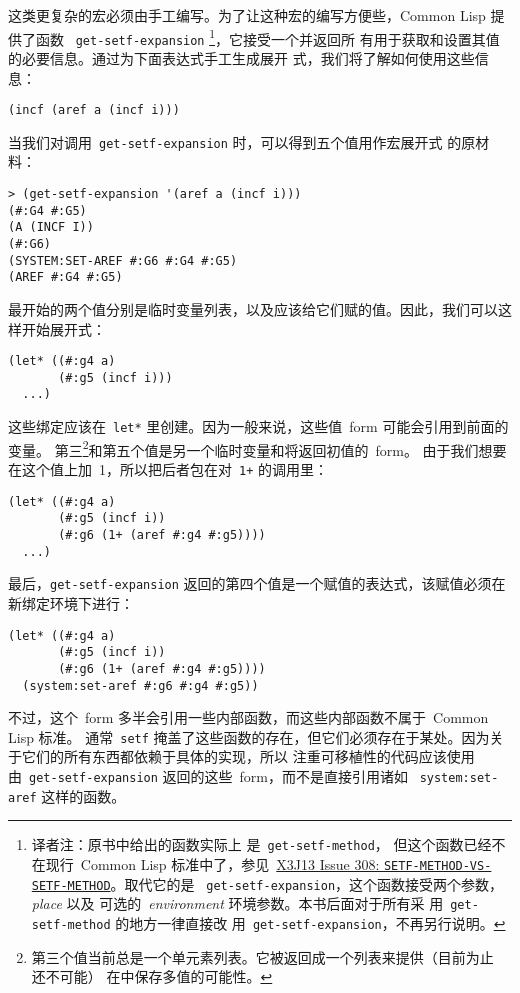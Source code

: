 这类更复杂的宏必须由手工编写。为了让这种宏的编写方便些，Common Lisp 提供了函数
~\verb|get-setf-expansion|
\footnote{译者注：原书中给出的函数实际上
  是~\texttt{get-setf-method}，
  但这个函数已经不在现行~Common Lisp 标准中了，参见~\href{www.lisp.org/HyperSpec/Issues/iss308_w.html}{X3J13 Issue 308:
  \texttt{SETF-METHOD-VS-SETF-METHOD}}。取代它的是
  ~\texttt{get-setf-expansion}，这个函数接受两个参数，\emph{place} 以及
  可选的~\emph{environment} 环境参数。本书后面对于所有采
  用~\texttt{get-setf-method} 的地方一律直接改
  用~\texttt{get-setf-expansion}，不再另行说明。}，它接受一个\gv{}并返回所
有用于获取和设置其值的必要信息。通过为下面表达式手工生成展开
式，我们将了解如何使用这些信息：
\begin{lstlisting}
(incf (aref a (incf i)))
\end{lstlisting}

当我们对\gv{}调用~\verb|get-setf-expansion| 时，可以得到五个值用作宏展开式
的原材料：
\begin{lstlisting}
> (get-setf-expansion '(aref a (incf i)))
(#:G4 #:G5)
(A (INCF I))
(#:G6)
(SYSTEM:SET-AREF #:G6 #:G4 #:G5)
(AREF #:G4 #:G5)
\end{lstlisting}
最开始的两个值分别是临时变量列表，以及应该给它们赋的值。因此，我们可以这样开始展开式：
\begin{lstlisting}
(let* ((#:g4 a)
       (#:g5 (incf i)))
  ...)
\end{lstlisting}
这些绑定应该在~\verb|let*| 里创建。因为一般来说，这些值~form 可能会引用到前面的变量。
第三\footnote{第三个值当前总是一个单元素列表。它被返回成一个列表来提供（目前为止
还不可能）
在\gv{}中保存多值的可能性。}和第五个值是另一个临时变量和将返回\gv{}初值的~form。
由于我们想要在这个值上加~1，所以把后者包在对~\verb|1+| 的调用里：
\begin{lstlisting}
(let* ((#:g4 a)
       (#:g5 (incf i))
       (#:g6 (1+ (aref #:g4 #:g5))))
  ...)
\end{lstlisting}
最后，\texttt{get-setf-expansion} 返回的第四个值是一个赋值的表达式，该赋值必须在新绑定环境下进行：
\begin{lstlisting}
(let* ((#:g4 a)
       (#:g5 (incf i))
       (#:g6 (1+ (aref #:g4 #:g5))))
  (system:set-aref #:g6 #:g4 #:g5))
\end{lstlisting}
不过，这个~form 多半会引用一些内部函数，而这些内部函数不属于~Common Lisp 标准。
通常~\verb|setf| 掩盖了这些函数的存在，但它们必须存在于某处。因为关于它们的所有东西都依赖于具体的实现，所以
注重可移植性的代码应该使用由~\verb|get-setf-expansion| 返回的这些~form，而不是直接引用诸如
~\verb|system:set-aref| 这样的函数。

